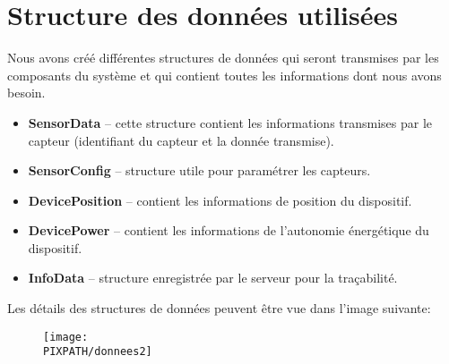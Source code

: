 \section{Structure des données utilisées} 

Nous avons créé différentes structures de données qui seront transmises par les 
composants du système et qui contient toutes les informations dont nous avons 
besoin. \\

\begin{itemize}
\item \textbf{SensorData} – cette structure contient les informations transmises 
par le capteur (identifiant du capteur et la donnée transmise).
\item \textbf{SensorConfig} –  structure utile pour paramétrer les capteurs.
\item \textbf{DevicePosition} – contient les informations de position du dispositif.
\item \textbf{DevicePower} – contient les informations de l’autonomie énergétique 
du dispositif.
\item \textbf{InfoData} – structure enregistrée par le serveur pour la traçabilité. \\
\end{itemize}

Les détails des structures de données peuvent être vue dans l'image suivante: 

    \begin{figure}
    \centering
    \texttt{[image: \\PIXPATH/donnees2]}
    \end{figure}
